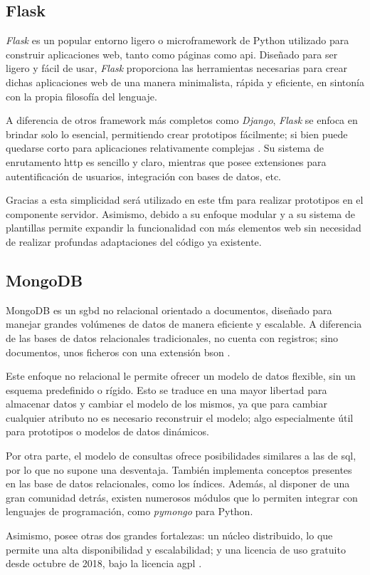     \subsection{Flask}

        \textit{Flask} es un popular entorno ligero o \gls{microframework} de Python utilizado para construir aplicaciones web, tanto como páginas como \gls{api}. Diseñado para ser ligero y fácil de usar, \textit{Flask} proporciona las herramientas necesarias para crear dichas aplicaciones web de una manera minimalista, rápida y eficiente, en sintonía con la propia filosofía del lenguaje. 

        A diferencia de otros \gls{framework} más completos como \textit{Django}, \textit{Flask} se enfoca en brindar solo lo esencial, permitiendo crear prototipos fácilmente; si bien puede quedarse corto para aplicaciones relativamente complejas \cite{rodriguez_flask_2014}. Su sistema de enrutamento \gls{http} es sencillo y claro, mientras que posee extensiones para autentificación de usuarios, integración con bases de datos, etc. 

        Gracias a esta simplicidad será utilizado en este \gls{tfm} para realizar prototipos en el componente servidor. Asimismo, debido a su enfoque modular y a su sistema de plantillas permite expandir la funcionalidad con más elementos web sin necesidad de realizar profundas adaptaciones del código ya existente.


    \subsection{MongoDB}
        MongoDB es un \gls{sgbd} no relacional orientado a documentos, diseñado para manejar grandes volúmenes de datos de manera eficiente y escalable. A diferencia de las bases de datos relacionales tradicionales, no cuenta con registros; sino documentos, unos ficheros con una extensión \gls{bson} \cite{mongodb_json_nodate}. 

        Este enfoque no relacional le permite ofrecer un modelo de datos flexible, sin un esquema predefinido o rígido. Esto se traduce en una mayor libertad para almacenar datos y cambiar el modelo de los mismos, ya que para cambiar cualquier atributo no es necesario reconstruir el modelo; algo especialmente útil para prototipos o modelos de datos dinámicos.
        
        Por otra parte, el modelo de consultas ofrece posibilidades similares a las de \gls{sql}, por lo que no supone una desventaja. También implementa conceptos presentes en las base de datos relacionales, como los índices. Además, al disponer de una gran comunidad detrás, existen numerosos módulos que lo permiten integrar con lenguajes de programación, como \textit{pymongo} para Python. 

        Asimismo, posee otras dos grandes fortalezas: un núcleo distribuido, lo que permite una alta disponibilidad y escalabilidad; y una licencia de uso gratuito desde octubre de 2018, bajo la licencia \gls{agpl} \cite{mongodb_que_nodate}.